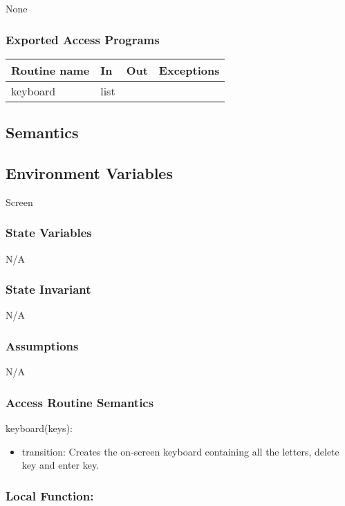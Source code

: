\documentclass[12pt]{article}
\begin{document}
None

\subsubsection* {Exported Access Programs}
\begin{tabular}{| l | l | l | p{6cm} |}
\hline
\textbf{Routine name} & \textbf{In} & \textbf{Out} & \textbf{Exceptions}\\
\hline
keyboard & list & ~ &  \\
\hline
\end{tabular}


\subsection* {Semantics}

\subsection*{Environment Variables}

Screen

\subsubsection* {State Variables}
N/A

\subsubsection* {State Invariant}

N/A

\subsubsection* {Assumptions}

N/A

\subsubsection* {Access Routine Semantics}

\noindent keyboard(keys):
\begin{itemize}
  \item transition: Creates the on-screen keyboard containing all the letters, delete key and enter key.
\end{itemize}

\subsubsection*{Local Function:}
\end{document}
